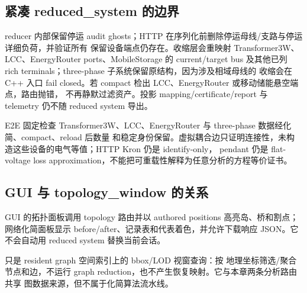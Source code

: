 \subsection{紧凑 reduced\_system 的边界}

reducer 内部保留停运 audit ghosts；HTTP 在序列化前删除停运母线/支路与停运详细负荷，并验证所有
保留设备端点仍存在。收缩层会重映射 Transformer3W、LCC、EnergyRouter ports、MobileStorage 的
current/target bus 及其他已列 rich terminals；three-phase 子系统保留原结构，因为涉及相域母线的
收缩会在 C++ 入口 fail closed。若 compact 检出 LCC、EnergyRouter 或移动储能悬空端点，路由抛错，
不再静默过滤资产。投影 mapping/certificate/report 与 telemetry 仍不随 reduced system 导出。

E2E 固定检查 Transformer3W、LCC、EnergyRouter 与 three-phase 数据经化简、compact、reload 后数量
和稳定身份保留。虚拟耦合边只证明连接性，未构造这些设备的电气等值；HTTP Kron 仍是 identify-only，
pendant 仍是 flat-voltage loss approximation，不能把可重载性解释为任意分析的方程等价证书。

\subsection{GUI 与 topology\_window 的关系}

GUI 的拓扑面板调用 topology 路由并以 authored positions 高亮岛、桥和割点；网络化简面板显示
before/after、记录表和代表着色，并允许下载响应 JSON。它不会自动用 reduced system 替换当前会话。

 只是 resident graph 空间索引上的 bbox/LOD 视窗查询：按
地理坐标筛选/聚合节点和边，不运行 graph reduction，也不产生恢复映射。它与本章两条分析路由共享
图数据来源，但不属于化简算法流水线。

